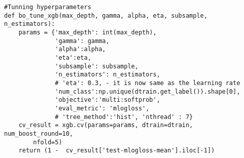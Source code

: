 \begin{lstlisting}
#Tunning hyperparameters
def bo_tune_xgb(max_depth, gamma, alpha, eta, subsample, n_estimators):
    params = {'max_depth': int(max_depth),
              'gamma': gamma,
              'alpha':alpha,
              'eta':eta,
              'subsample': subsample,
              'n_estimators': n_estimators,
              # 'eta': 0.3, - it is now same as the learning rate
              'num_class':np.unique(dtrain.get_label()).shape[0],
              'objective':'multi:softprob', 
              'eval_metric': 'mlogloss',
              # 'tree_method':'hist', 'nthread' : 7}
    cv_result = xgb.cv(params=params, dtrain=dtrain, num_boost_round=10, 
        nfold=5)
    return (1 -  cv_result['test-mlogloss-mean'].iloc[-1])
    



\end{lstlisting}